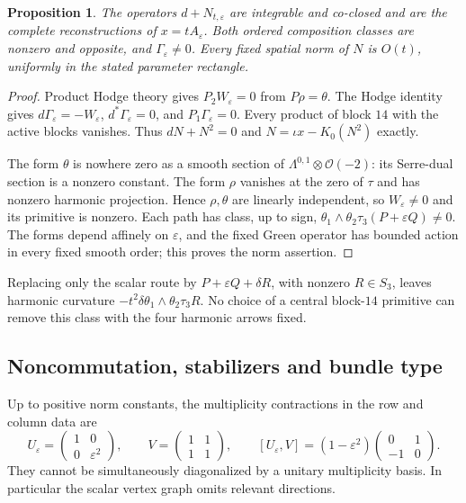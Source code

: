 \documentclass[11pt]{amsart}
\newtheorem{proposition}[theorem]{Proposition}
\theoremstyle{definition}
\theoremstyle{remark}
\newcommand{\cO}{\mathcal O}
\begin{document}
\begin{proposition}\label{prop:fixed-integrable}
The operators $d+N_{t,\varepsilon}$ are integrable and co-closed and
are the complete reconstructions of $x=tA_\varepsilon$.
Both ordered composition classes are nonzero and opposite, and
$\Gamma_\varepsilon\ne0$. Every fixed spatial norm of $N$ is $O(t)$,
uniformly in the stated parameter rectangle.
\end{proposition}
\begin{proof}
Product Hodge theory gives $P_2W_\varepsilon=0$ from
$P\rho=\theta$. The Hodge identity gives
$d\Gamma_\varepsilon=-W_\varepsilon$, $d^*\Gamma_\varepsilon=0$,
and $P_1\Gamma_\varepsilon=0$. Every product of block $14$ with
the active blocks vanishes. Thus $dN+N^2=0$ and
$N=\iota x-K_0(N^2)$ exactly.

The form $\theta$ is nowhere zero as a smooth section of
$\Lambda^{0,1}\otimes\cO(-2)$: its Serre-dual section is a nonzero
constant. The form $\rho$ vanishes at the zero of $\tau$ and has
nonzero harmonic projection. Hence $\rho,\theta$ are linearly
independent, so $W_\varepsilon\ne0$ and its primitive is nonzero.
Each path has class, up to sign,
$\theta_1\wedge\theta_2\tau_3(P+\varepsilon Q)\ne0$.
The forms depend affinely on $\varepsilon$, and the fixed Green
operator has bounded action in every fixed smooth order; this proves
the norm assertion.
\end{proof}

Replacing only the
scalar route by $P+\varepsilon Q+\delta R$, with nonzero $R\in S_3$,
leaves harmonic curvature
$-t^2\delta\theta_1\wedge\theta_2\tau_3R$. No choice of a central
block-$14$ primitive can remove this class with the four harmonic
arrows fixed.

\subsection{Noncommutation, stabilizers and bundle type}
Up to positive norm constants, the multiplicity contractions in the
row and column data are
\begin{equation}\label{eq:fixed-commutator}
 U_\varepsilon=\begin{pmatrix}1&0\\0&\varepsilon^2\end{pmatrix},
 \qquad V=\begin{pmatrix}1&1\\1&1\end{pmatrix},\qquad
 [U_\varepsilon,V]=(1-\varepsilon^2)
                 \begin{pmatrix}0&1\\-1&0\end{pmatrix}.
\end{equation}
They cannot be simultaneously diagonalized by a unitary multiplicity
basis. In particular the scalar vertex graph omits relevant directions.
\end{document}
